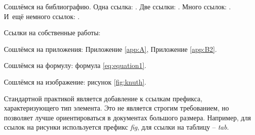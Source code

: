 Сошлёмся на библиографию.
Одна ссылка: \cite[с.~54]{Sokolov}\cite[с.~36]{Gaidaenko}.
Две ссылки: \cite{Sokolov,Gaidaenko}.
Много ссылок: %
\cite{Lermontov, Management, Borozda, Marketing, Constitution, FamilyCode,
Gost.7.0.53, Razumovski, Lagkueva, Pokrovski, Methodology, Nasirova, Berestova,
Kriger}%
%
.
И~ещё немного ссылок:
\cite{Article,Book,Booklet,Conference,Inbook,Incollection,Manual,Mastersthesis,
Misc,Phdthesis,Proceedings,Techreport,Unpublished}
\cite{medvedev2006jelektronnye, CEAT:CEAT581, doi:10.1080/01932691.2010.513279,
Gosele1999161,Li2007StressAnalysis, Shoji199895, test:eisner-sample,
test:eisner-sample-shorted, AB_patent_Pomerantz_1968, iofis_patent1960}
%
.

%

Ссылки на собственные работы:~\cite{vakbib1, confbib1}

Сошлёмся на приложения: Приложение \ref{app:A}, Приложение \ref{app:B2}.

Сошлёмся на формулу: формула \eqref{eq:equation1}.

Сошлёмся на изображение: рисунок \ref{fig:knuth}.

Стандартной практикой является добавление к ссылкам префикса, характеризующего тип элемента.
Это не является строгим требованием, но позволяет лучше ориентироваться в документах большого размера.
Например, для ссылок на рисунки используется префикс \textit{fig},
для ссылки на таблицу -- \textit{tab}.

